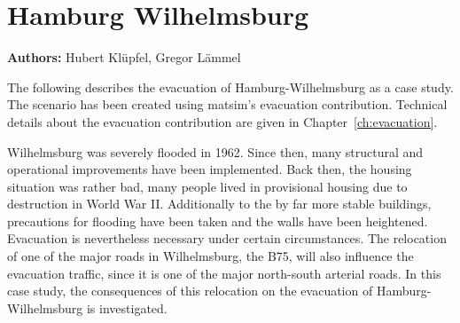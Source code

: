 \chapter{Hamburg Wilhelmsburg}
\label{ch:hhw}
\hfill \textbf{Authors:} Hubert Klüpfel, Gregor Lämmel


The following describes the evacuation of Hamburg-Wilhelmsburg as a case study. 
The scenario has been created using \gls{matsim}'s evacuation \gls{contribution}. Technical details about the evacuation \gls{contribution} are given in Chapter~\ref{ch:evacuation}. 

Wilhelmsburg was severely flooded in 1962. Since then, many structural and operational improvements have been implemented. Back then, the housing situation was rather bad, many people lived in provisional housing due to destruction in World War II. Additionally to the by far more stable buildings, precautions for flooding have been taken and the walls have been heightened. Evacuation is nevertheless necessary under certain circumstances. The relocation of one of the major roads in Wilhelmsburg, the B75, will also influence the evacuation traffic, since it is one of the major north-south arterial roads. In this case study, the consequences of this relocation on the evacuation of Hamburg-Wilhelmsburg is investigated.

